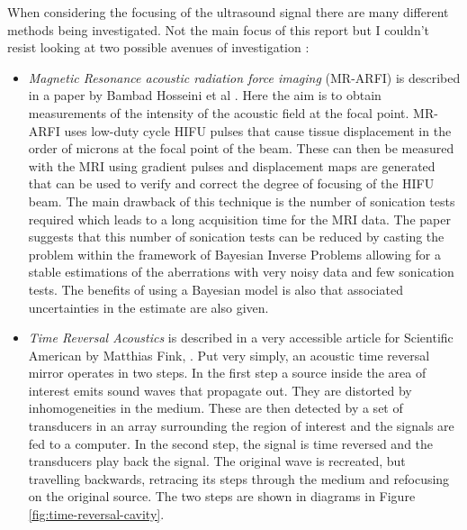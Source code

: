 \documentclass[11pt]{article} %
\begin{document}
	When considering the focusing of the ultrasound signal there are many different methods being investigated. Not the main focus of this report but I couldn't resist looking at two possible avenues of investigation : 
	\begin{itemize}
		\item  \textit{Magnetic Resonance acoustic radiation force imaging} (MR-ARFI) is described in a paper by Bambad Hosseini et al	\cite{Hosseini2018}. Here the aim is to obtain measurements of the intensity of the acoustic field at the focal point. MR-ARFI uses low-duty cycle HIFU pulses that cause tissue displacement in the order of microns at the focal point of the beam. These can then be measured with the MRI using gradient pulses and displacement maps are generated that can be used to verify and correct the degree of focusing of the HIFU beam. The main drawback of this technique is the number of sonication tests required which leads to a long acquisition time for the MRI data. The paper suggests that this number of sonication tests can be reduced by casting the problem within the framework of Bayesian Inverse Problems allowing for a stable estimations of the aberrations with very noisy data and few sonication tests. The benefits of using a Bayesian model is also that associated uncertainties in the estimate are also given.
		\item \textit{Time Reversal Acoustics} is described in a very accessible article for Scientific American by Matthias Fink, \cite{Fink1999}. Put very simply, an acoustic time reversal mirror operates in two steps. In the first step a source inside the area of interest emits sound waves that propagate out. They are distorted by inhomogeneities in the medium. These are then detected by a set of transducers in an array surrounding the region of interest and the signals are fed to a computer. In the second step, the signal is time reversed and the transducers play back the signal. The original wave is recreated, but travelling backwards, retracing its steps through the medium and refocusing on the original source.  The two steps are shown in diagrams in Figure \ref{fig:time-reversal-cavity}. 
		

\end{itemize}
\end{document}
